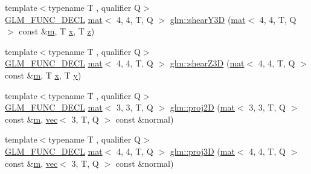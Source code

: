 \begin{DoxyCompactItemize}
{\footnotesize template$<$typename T , qualifier Q$>$ }\\\mbox{\hyperlink{setup_8hpp_ab2d052de21a70539923e9bcbf6e83a51}{G\+L\+M\+\_\+\+F\+U\+N\+C\+\_\+\+D\+E\+CL}} \mbox{\hyperlink{structglm_1_1mat}{mat}}$<$ 4, 4, T, Q $>$ \mbox{\hyperlink{group__gtx__transform2_gade5bb65ffcb513973db1a1314fb5cfac}{glm\+::shear\+Y3D}} (\mbox{\hyperlink{structglm_1_1mat}{mat}}$<$ 4, 4, T, Q $>$ const \&\mbox{\hyperlink{_s_d_l__opengl__glext_8h_af593500c283bf1a787a6f947f503a5c2}{m}}, T \mbox{\hyperlink{_s_d_l__opengl_8h_ad0e63d0edcdbd3d79554076bf309fd47}{x}}, T \mbox{\hyperlink{_s_d_l__opengl__glext_8h_a5e74030ebb3297ce1b37ff716fedd68f}{z}})
\item 
{\footnotesize template$<$typename T , qualifier Q$>$ }\\\mbox{\hyperlink{setup_8hpp_ab2d052de21a70539923e9bcbf6e83a51}{G\+L\+M\+\_\+\+F\+U\+N\+C\+\_\+\+D\+E\+CL}} \mbox{\hyperlink{structglm_1_1mat}{mat}}$<$ 4, 4, T, Q $>$ \mbox{\hyperlink{group__gtx__transform2_ga6591e0a3a9d2c9c0b6577bb4dace0255}{glm\+::shear\+Z3D}} (\mbox{\hyperlink{structglm_1_1mat}{mat}}$<$ 4, 4, T, Q $>$ const \&\mbox{\hyperlink{_s_d_l__opengl__glext_8h_af593500c283bf1a787a6f947f503a5c2}{m}}, T \mbox{\hyperlink{_s_d_l__opengl_8h_ad0e63d0edcdbd3d79554076bf309fd47}{x}}, T \mbox{\hyperlink{_s_d_l__opengl_8h_a1675d9d7bb68e1657ff028643b4037e3}{y}})
\item 
{\footnotesize template$<$typename T , qualifier Q$>$ }\\\mbox{\hyperlink{setup_8hpp_ab2d052de21a70539923e9bcbf6e83a51}{G\+L\+M\+\_\+\+F\+U\+N\+C\+\_\+\+D\+E\+CL}} \mbox{\hyperlink{structglm_1_1mat}{mat}}$<$ 3, 3, T, Q $>$ \mbox{\hyperlink{group__gtx__transform2_ga5b992a0cdc8298054edb68e228f0d93e}{glm\+::proj2D}} (\mbox{\hyperlink{structglm_1_1mat}{mat}}$<$ 3, 3, T, Q $>$ const \&\mbox{\hyperlink{_s_d_l__opengl__glext_8h_af593500c283bf1a787a6f947f503a5c2}{m}}, \mbox{\hyperlink{structglm_1_1vec}{vec}}$<$ 3, T, Q $>$ const \&normal)
\item 
{\footnotesize template$<$typename T , qualifier Q$>$ }\\\mbox{\hyperlink{setup_8hpp_ab2d052de21a70539923e9bcbf6e83a51}{G\+L\+M\+\_\+\+F\+U\+N\+C\+\_\+\+D\+E\+CL}} \mbox{\hyperlink{structglm_1_1mat}{mat}}$<$ 4, 4, T, Q $>$ \mbox{\hyperlink{group__gtx__transform2_gaa2b7f4f15b98f697caede11bef50509e}{glm\+::proj3D}} (\mbox{\hyperlink{structglm_1_1mat}{mat}}$<$ 4, 4, T, Q $>$ const \&\mbox{\hyperlink{_s_d_l__opengl__glext_8h_af593500c283bf1a787a6f947f503a5c2}{m}}, \mbox{\hyperlink{structglm_1_1vec}{vec}}$<$ 3, T, Q $>$ const \&normal)

\end{DoxyCompactItemize}
